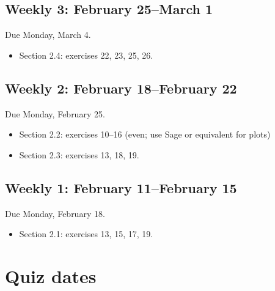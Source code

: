 \subsection{Weekly 3: February 25--March 1}
\label{weekly3:february25--march1}

Due Monday, March 4.

\begin{itemize}
\item Section 2.4: exercises 22, 23, 25, 26.

\end{itemize}

\subsection{Weekly 2: February 18--February 22}
\label{weekly2:february18--february22}

Due Monday, February 25.

\begin{itemize}
\item Section 2.2: exercises 10--16 (even; use Sage or equivalent for plots)

\item Section 2.3: exercises 13, 18, 19.

\end{itemize}

\subsection{Weekly 1: February 11--February 15}
\label{weekly1:february11--february15}

Due Monday, February 18.

\begin{itemize}
\item Section 2.1: exercises 13, 15, 17, 19.

\end{itemize}

\section{Quiz dates}
\label{quizzes}

